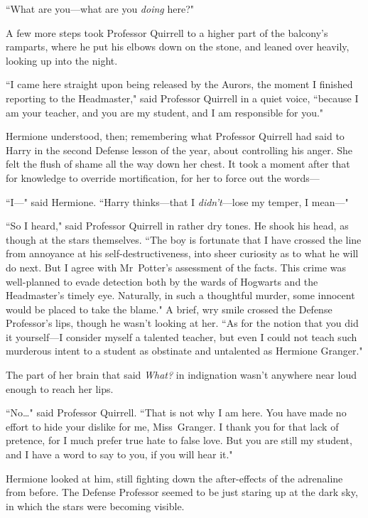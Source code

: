 ``What are you—what are you \emph{doing} here?"

A few more steps took Professor Quirrell to a higher part of the balcony's ramparts, where he put his elbows down on the stone, and leaned over heavily, looking up into the night.

``I came here straight upon being released by the Aurors, the moment I finished reporting to the Headmaster," said Professor Quirrell in a quiet voice, ``because I am your teacher, and you are my student, and I am responsible for you."

Hermione understood, then; remembering what Professor Quirrell had said to Harry in the second Defense lesson of the year, about controlling his anger. She felt the flush of shame all the way down her chest. It took a moment after that for knowledge to override mortification, for her to force out the words—

``I—" said Hermione. ``Harry thinks—that I \emph{didn't}—lose my temper, I mean—"

``So I heard," said Professor Quirrell in rather dry tones. He shook his head, as though at the stars themselves. ``The boy is fortunate that I have crossed the line from annoyance at his self-destructiveness, into sheer curiosity as to what he will do next. But I agree with Mr~Potter's assessment of the facts. This crime was well-planned to evade detection both by the wards of Hogwarts and the Headmaster's timely eye. Naturally, in such a thoughtful murder, some innocent would be placed to take the blame." A brief, wry smile crossed the Defense Professor's lips, though he wasn't looking at her. ``As for the notion that you did it yourself—I consider myself a talented teacher, but even I could not teach such murderous intent to a student as obstinate and untalented as Hermione Granger."

The part of her brain that said \emph{What?} in indignation wasn't anywhere near loud enough to reach her lips.

``No{\ldots}" said Professor Quirrell. ``That is not why I am here. You have made no effort to hide your dislike for me, Miss~Granger. I thank you for that lack of pretence, for I much prefer true hate to false love. But you are still my student, and I have a word to say to you, if you will hear it."

Hermione looked at him, still fighting down the after-effects of the adrenaline from before. The Defense Professor seemed to be just staring up at the dark sky, in which the stars were becoming visible.


